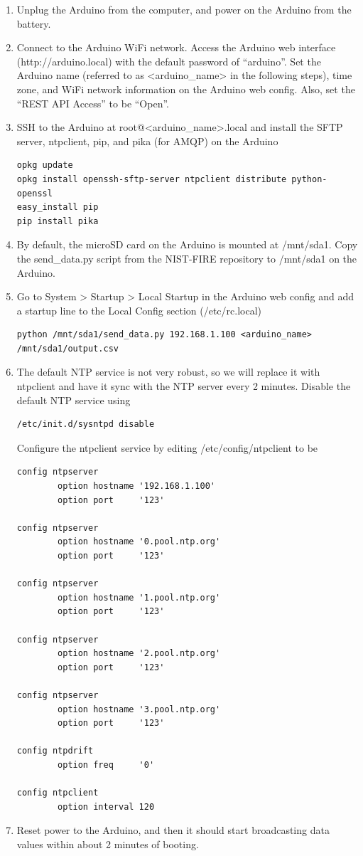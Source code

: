 \documentclass[11pt,oneside]{book}
\begin{document}
\begin{enumerate}
\item Unplug the Arduino from the computer, and power on the Arduino from the battery.
\item Connect to the Arduino WiFi network. Access the Arduino web interface (http://arduino.local) with the default password of ``arduino''. Set the Arduino name (referred to as <arduino\_name> in the following steps), time zone, and WiFi network information on the Arduino web config. Also, set the ``REST API Access'' to be ``Open''.
\item SSH to the Arduino at root@<arduino\_name>.local and install the SFTP server, ntpclient, pip, and pika (for AMQP) on the Arduino
\begin{verbatim}
opkg update
opkg install openssh-sftp-server ntpclient distribute python-openssl
easy_install pip
pip install pika
\end{verbatim}
\item By default, the microSD card on the Arduino is mounted at /mnt/sda1. Copy the send\_data.py script from the NIST-FIRE repository to /mnt/sda1 on the Arduino.
\item Go to System > Startup > Local Startup in the Arduino web config and add a startup line to the Local Config section (/etc/rc.local)
\small
\begin{verbatim}
python /mnt/sda1/send_data.py 192.168.1.100 <arduino_name> /mnt/sda1/output.csv
\end{verbatim}
\normalsize
\clearpage
\item The default NTP service is not very robust, so we will replace it with ntpclient and have it sync with the NTP server every 2 minutes. Disable the default NTP service using
\begin{verbatim}
/etc/init.d/sysntpd disable
\end{verbatim}
Configure the ntpclient service by editing /etc/config/ntpclient to be
\begin{verbatim}
config ntpserver
        option hostname '192.168.1.100'
        option port     '123'

config ntpserver
        option hostname '0.pool.ntp.org'
        option port     '123'

config ntpserver
        option hostname '1.pool.ntp.org'
        option port     '123'

config ntpserver
        option hostname '2.pool.ntp.org'
        option port     '123'

config ntpserver
        option hostname '3.pool.ntp.org'
        option port     '123'

config ntpdrift                                 
        option freq     '0'                     
                                                
config ntpclient                                
        option interval 120
\end{verbatim}
\item Reset power to the Arduino, and then it should start broadcasting data values within about 2 minutes of booting.
\end{enumerate}
\end{document}
